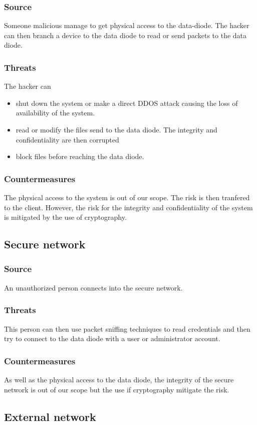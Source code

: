 \documentclass[a4paper,11pt]{article}
\begin{document}
\subsubsection{Source}
Someone malicious manage to get physical access to the data-diode. The hacker can then branch a device to the data diode to read or send packets to the data diode.
\subsubsection{Threats}
The hacker can
\begin{itemize}
\item shut down the system or make a direct DDOS attack causing the loss of availability of the system.
\item read or modify the files send to the data diode. The integrity and confidentiality are then corrupted
\item block files before reaching the data diode.
\end{itemize}
\subsubsection{Countermeasures}
The physical access to the system is out of our scope. The risk is then tranfered to the client. However, the risk for the integrity and confidentiality of the system is mitigated by the use of cryptography.
\subsection{Secure network}
\subsubsection{Source}
An unauthorized person connects into the secure network.
\subsubsection{Threats}
This person can then use packet sniffing techniques to read credentials and then try to connect to the data diode with a user or administrator account.
\subsubsection{Countermeasures}
As well as the physical access to the data diode, the integrity of the secure network is out of our scope but the use if cryptography mitigate the risk.
\subsection{External network}
\end{document}
